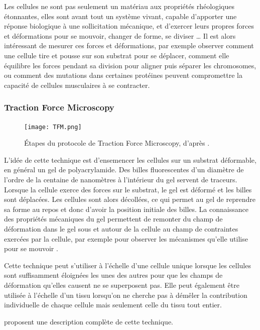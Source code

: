 Les cellules ne sont pas seulement un matériau aux propriétés rhéologiques étonnantes, elles sont avant tout un système vivant, capable d'apporter une réponse biologique à une sollicitation mécanique, et d'exercer leurs propres forces et déformations pour se mouvoir, changer de forme, se diviser \dots 
Il est alors intéressant de mesurer ces forces et déformations, par exemple observer comment une cellule tire et pousse sur son substrat pour se déplacer, comment elle équilibre les forces pendant sa division pour aligner puis séparer les chromosomes, ou comment des mutations dans certaines protéines peuvent compromettre la capacité de cellules musculaires à se contracter.

\subsubsection{Traction Force Microscopy}

\begin{figure}
\texttt{[image: TFM.png]}
\caption{\'Etapes du protocole de Traction Force Microscopy, d'après \cite{martiel_measurement_2015}.}
\end{figure}

L'idée de cette technique est d'ensemencer les cellules sur un substrat déformable, en général un gel de polyacrylamide. 
Des billes fluorescentes d'un diamètre de l'ordre de la centaine de nanomètres à l'intérieur du gel servent de traceurs. 
Lorsque la cellule exerce des forces sur le substrat, le gel est déformé et les billes sont déplacées. 
Les cellules sont alors décollées, ce qui permet au gel de reprendre sa forme au repos et donc d'avoir la position initiale des billes. 
La connaissance des propriétés mécaniques du gel permettent de remonter du champ de déformation dans le gel sous et autour de la cellule au champ de contraintes exercées par la cellule, par exemple pour observer les mécanismes qu'elle utilise pour se mouvoir \parencite{delanoe-ayari_4d_2010}.

Cette technique peut s'utiliser à l'échelle d'une cellule unique lorsque les cellules sont suffisamment éloignées les unes des autres pour que les champs de déformation qu'elles causent ne se superposent pas. 
Elle peut également être utilisée à l'échelle d'un tissu lorsqu'on ne cherche pas à démêler la contribution individuelle de chaque cellule mais seulement celle du tissu tout entier. 

\cite{martiel_measurement_2015} proposent une description complète de cette technique. 

